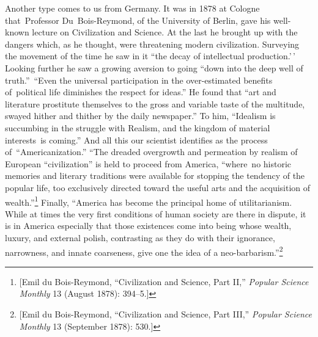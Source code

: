 \documentclass[twoside,symmetric,nobib,justified]{tufte-book}
\begin{document}
Another type comes to us from Germany. It was in 1878 at Cologne
that~Professor Du~Bois-Reymond, of the University of Berlin, gave his
well-known lecture on Civilization and Science. At the last he brought
up with the dangers which, as he thought, were threatening modern
civilization. Surveying the movement of the time he saw in it ``the
decay of intellectual production.'\,' Looking further he saw a growing
aversion to going ``down into the deep well of truth.''~``Even the
universal participation in the over-estimated benefits of~political life
diminishes the respect for ideas.'' He found that ``art and literature
prostitute themselves to the gross and variable taste of the multitude,
swayed hither and thither by the daily newspaper.'' To him, ``Idealism
is succumbing in the struggle with Realism, and the kingdom of material
interests~is coming.'' And all this our scientist identifies as the
process of~``Americanization.'' ``The dreaded overgrowth and permeation
by realism of European ``civilization'' is held to proceed from America,
``where~no historic memories and literary traditions were available for
stopping the tendency of the popular life, too exclusively directed
toward the useful arts and the acquisition of wealth.''\footnote{{[}Emil
  du Bois-Reymond, ``Civilization and Science, Part II,'' \emph{Popular
  Science Monthly} 13 (August 1878): 394--5.{]}} Finally, ``America has
become the principal home of utilitarianism. While at times the very
first conditions of human society are there in dispute, it is in America
especially that those existences come into being whose wealth, luxury,
and external polish, contrasting as they do with their ignorance,
narrowness, and innate coarseness, give one the idea of a
neo-barbarism.''\footnote{{[}Emil du Bois-Reymond, ``Civilization and
  Science, Part III,'' \emph{Popular Science Monthly} 13 (September
  1878): 530.{]}}~
\end{document}
